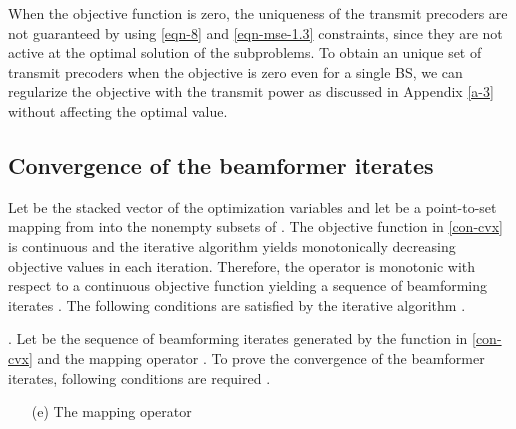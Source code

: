 When the objective function is zero, the uniqueness of the transmit precoders are not guaranteed by using \eqref{eqn-8} and \eqref{eqn-mse-1.3} constraints, since they are not active at the optimal solution of the subproblems. To obtain an unique set of transmit precoders when the objective is zero even for a single \ac{BS}, we can regularize the objective with the transmit power as discussed in Appendix \ref{a-3} without affecting the optimal value.

\subsection{Convergence of the beamformer iterates}

Let \me{\mbf{\ma} \triangleq [\mx,\my,\mz]} be the stacked vector of the optimization variables and let  be a point-to-set mapping from  into the nonempty subsets of . The objective function  in \eqref{con-cvx} is continuous and the iterative algorithm yields monotonically decreasing objective values  in each iteration. Therefore, the operator  is monotonic with respect to a continuous objective function  yielding a sequence of beamforming iterates . The following conditions are satisfied by the iterative algorithm \cite{meyer1976sufficient}.
\begin{itemize}

\end{itemize}

 

. Let  be the sequence of beamforming iterates generated by the function  in \eqref{con-cvx} and the mapping operator . To prove the convergence of the beamformer iterates, following conditions are required \cite{meyer1976sufficient}.
\begin{itemize}
\item[(e)] The mapping operator \
\end{itemize}



